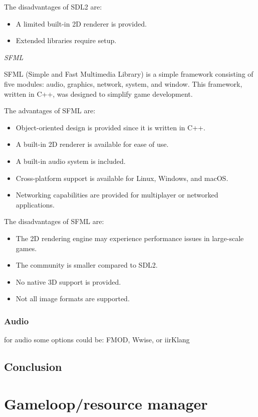\documentclass{projdoc}
\begin{document}
    The disadvantages of SDL2 are: 
    \begin{itemize} 
        \item A limited built-in 2D renderer is provided. 
        \item Extended libraries require setup. 
    \end{itemize}
    
    \emph{SFML}
    
    SFML (Simple and Fast Multimedia Library) is a simple framework consisting of five modules: audio, graphics, network, system, and window. This framework, written in C++, was designed to simplify game development.
    
    The advantages of SFML are: 
    \begin{itemize} 
        \item Object-oriented design is provided since it is written in C++. 
        \item A built-in 2D renderer is available for ease of use. 
        \item A built-in audio system is included. 
        \item Cross-platform support is available for Linux, Windows, and macOS. 
        \item Networking capabilities are provided for multiplayer or networked applications. 
    \end{itemize}
    
    The disadvantages of SFML are: 
    \begin{itemize} 
        \item The 2D rendering engine may experience performance issues in large-scale games. 
        \item The community is smaller compared to SDL2. 
        \item No native 3D support is provided. 
        \item Not all image formats are supported. 
    \end{itemize}
    \subsubsection{Audio}
    for audio some options could be: FMOD, Wwise, or iirKlang
    \subsection{Conclusion}
\section{Gameloop/resource manager}
\end{document}
